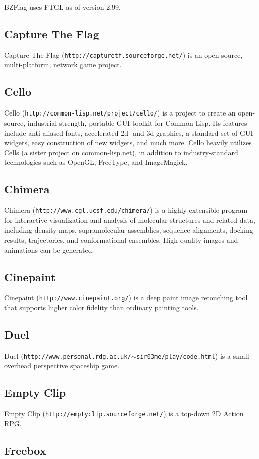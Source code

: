 BZFlag uses FTGL as of version 2.99.\subsection{Capture The Flag}\label{ftgl-projects_capturetf}
Capture The Flag ({\tt http://capturetf.sourceforge.net/}) is an open source, multi-platform, network game project.\subsection{Cello}\label{ftgl-projects_cello}
Cello ({\tt http://common-lisp.net/project/cello/}) is a project to create an open-source, industrial-strength, portable GUI toolkit for Common Lisp. Its features include anti-aliased fonts, accelerated 2d- and 3d-graphics, a standard set of GUI widgets, easy construction of new widgets, and much more. Cello heavily utilizes Cells (a sister project on common-lisp.net), in addition to industry-standard technologies such as OpenGL, FreeType, and ImageMagick.\subsection{Chimera}\label{ftgl-projects_chimera}
Chimera ({\tt http://www.cgl.ucsf.edu/chimera/}) is a highly extensible program for interactive visualization and analysis of molecular structures and related data, including density maps, supramolecular assemblies, sequence alignments, docking results, trajectories, and conformational ensembles. High-quality images and animations can be generated.\subsection{Cinepaint}\label{ftgl-projects_cinepaint}
Cinepaint ({\tt http://www.cinepaint.org/}) is a deep paint image retouching tool that supports higher color fidelity than ordinary painting tools.\subsection{Duel}\label{ftgl-projects_duel}
Duel ({\tt http://www.personal.rdg.ac.uk/$\sim$sir03me/play/code.html}) is a small overhead perspective spaceship game.\subsection{Empty Clip}\label{ftgl-projects_emptyclip}
Empty Clip ({\tt http://emptyclip.sourceforge.net/}) is a top-down 2D Action RPG.\subsection{Freebox}\label{ftgl-projects_freebox}
